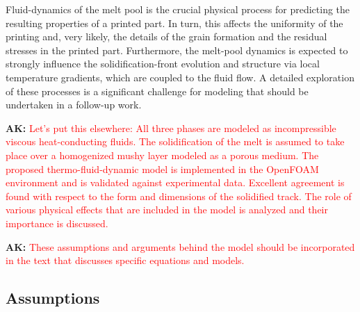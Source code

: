 \documentclass[final]{elsarticle} %
\newcommand{\OpenFOAM}{OpenFOAM\textregistered\xspace}
\newcommand{\ak}[1] {\textbf{AK:} \textcolor{red}{#1}}
\begin{document}
Fluid-dynamics of the melt pool is the crucial physical process
for predicting the resulting properties of a printed part.
In turn, this affects the uniformity of the printing and, very likely, the details of the grain formation
and the residual stresses in the printed part.
Furthermore, the melt-pool dynamics is expected to strongly influence the solidification-front evolution
and structure via local temperature gradients, which are coupled to the fluid flow.
A detailed exploration of these processes is a significant challenge for modeling
that should be undertaken in a follow-up work.

\ak{Let's put this elsewhere:
All three phases are modeled as incompressible viscous heat-conducting fluids.
The solidification of the melt is assumed to take place over a homogenized mushy layer modeled as a porous medium.
The proposed thermo-fluid-dynamic model is implemented in the \OpenFOAM environment
and is validated against experimental data.
Excellent agreement is found with respect to the form and dimensions of the solidified track.
The role of various physical effects that are included in the model is analyzed
and their importance is discussed.}

\ak{These assumptions and arguments behind the model should be incorporated in the text that discusses specific equations and models.}

\subsection{Assumptions}
\end{document}
